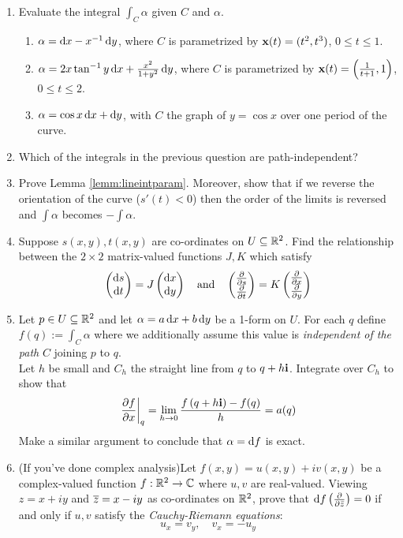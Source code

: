 \begin{exercises}
\begin{enumerate}
	
	

  \item Evaluate the integral $\int_C\alpha$ given $C$ and $\alpha$.\vspace{-6pt}
  \begin{enumerate}\itemsep2pt
    \item $\alpha=\dx-x^{-1}\,\dy$, where $C$ is parametrized by $\vx(t)=(t^2,t^3)$, $0\le t\le 1$.
    \item $\alpha=2x\tan^{-1}y\,\dx+\frac{x^2}{1+y^2}\,\dy$, where $C$ is parametrized by $\vx(t)=\left(\frac 1{t+1},1\right)$, $0\le t\le 2$.
    \item $\alpha=\cos x\,\dx+\dy$, with $C$ the graph of $y=\cos x$ over one period of the curve.
	\end{enumerate}
	
	
	\item Which of the integrals in the previous question are path-independent?
	
	
	\item Prove Lemma \ref{lemm:lineintparam}. Moreover, show that if we reverse the orientation of the curve ($s'(t)<0$) then the order of the limits is reversed and $\int\alpha$ becomes $-\int\alpha$.
	

	\item Suppose $s(x,y), t(x,y)$ are co-ordinates on $U\subseteq\R^2$. Find the relationship between the $2\times 2$ matrix-valued functions $J,K$ which satisfy
	\[
	\twovec{\ds}{\dt}=J\twovec{\dx}{\dy}\quad\text{and}\quad 
	\twovec{\partials s}{\partials t}=K\twovec{\partials x}{\partials y}
	\]

	
	\item Let $p\in U\subseteq\R^2$ and let $\alpha=a\,\dx+b\,\dy$ be a 1-form on $U$. For each $q$ define $f(q):=\int_C\alpha$ where we additionally assume this value is \emph{independent of the path} $C$ joining $p$ to $q$.\\
	Let $h$ be small and $C_h$ the straight line from $q$ to $q+h\vi$. Integrate over $C_h$ to show that
	\[\partialsat[f]{x}{q}=\lim\limits_{h\to 0}\frac{f\left(q+h\vi\right)-f(q)}h=a(q)\]
	Make a similar argument to conclude that $\alpha=\df$ is exact.
	
	
	\item (If you've done complex analysis)\quad Let $f(x,y)=u(x,y)+iv(x,y)$ be a complex-valued function $f:\R^2\to\C$ where $u,v$ are real-valued. Viewing $z=x+iy$ and $\cl z=x-iy$ as co-ordinates on $\R^2$, prove that $\df\left(\partials{\bar z}\right)=0$ if and only if $u,v$ satisfy the \emph{Cauchy-Riemann equations}:
	\[u_x=v_y,\quad v_x=-u_y\]
\end{enumerate}
\end{exercises}

